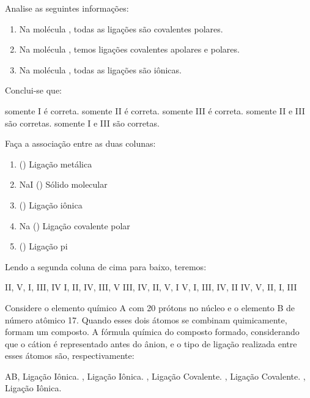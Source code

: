 \documentclass[9qpt]{scrartcl}
\begin{document}
\begin{exercise}[points=1.0]
Analise as seguintes informações:
\begin{enumerate}
\item Na molécula , todas as ligações são covalentes polares.
\item Na molécula , temos ligações covalentes apolares e polares.
\item Na molécula , todas as ligações são iônicas.
\end{enumerate}

Conclui-se que:

\begin{choice}
\choice somente I é correta.
\choice somente II é correta.
\choice somente III é correta.
\choice somente II e III são corretas.
\choice somente I e III são corretas.
\end{choice}
\end{exercise}

\begin{exercise}[points=1.0]
Faça a associação entre as duas colunas:

\begin{enumerate}[label=\Roman*.]
\item {} (\quad ) Ligação metálica
\item NaI (\quad ) Sólido molecular
\item {} (\quad ) Ligação iônica
\item Na (\quad) Ligação covalente polar
\item {} (\quad) Ligação pi
\end{enumerate}

Lendo a segunda coluna de cima para baixo, teremos:

\begin{choice}
\choice II, V, I, III, IV
\choice I, II, IV, III, V
\choice III, IV, II, V, I
\choice V, I, III, IV, II
\choice IV, V, II, I, III
\end{choice}
\end{exercise}



\begin{exercise}[points=1.0]
Considere o elemento químico A com 20 prótons no núcleo e o elemento B de número atômico 17. Quando esses dois átomos se combinam quimicamente, formam um composto. A fórmula química do composto formado, considerando que o cátion é representado antes do ânion, e o tipo de ligação realizada entre esses átomos são, respectivamente:
\begin{choice}
\choice AB, Ligação Iônica.
\choice {}, Ligação Iônica.
\choice {}, Ligação Covalente.
\choice {}, Ligação Covalente.
\choice {}, Ligação Iônica.
\end{choice}
\end{exercise}
\end{document}
